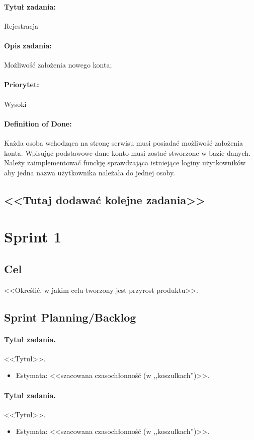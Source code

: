\documentclass[a4paper]{article}
\begin{document}
	\paragraph{Tytuł zadania:} Rejestracja
	\paragraph{Opis zadania:} Możliwość założenia nowego konta;
	\paragraph{Priorytet:} Wysoki
	\paragraph{Definition of Done:} Każda osoba wchodząca na stronę serwisu musi posiadać możliwość założenia konta. Wpisując podstawowe dane konto musi zostać stworzone w bazie danych. Należy zaimplementować funckję sprawdzająca istniejące loginy użytkowników aby jedna nazwa użytkownika należała do jednej osoby.
	
	\subsection*{<<Tutaj dodawać kolejne zadania>>}
	
	\section{Sprint 1}
	\subsection{Cel} <<Określić, w jakim celu tworzony jest przyrost produktu>>.
	\subsection{Sprint Planning/Backlog}
	
	\paragraph{Tytuł zadania.} <<Tytuł>>.
	\begin{itemize}
		\item Estymata: <<szacowana czasochłonność (w ,,koszulkach'')>>.
	\end{itemize}
	
	\paragraph{Tytuł zadania.} <<Tytuł>>.
	\begin{itemize}
		\item Estymata: <<szacowana czasochłonność (w ,,koszulkach'')>>.
	\end{itemize}
	
\end{document}
